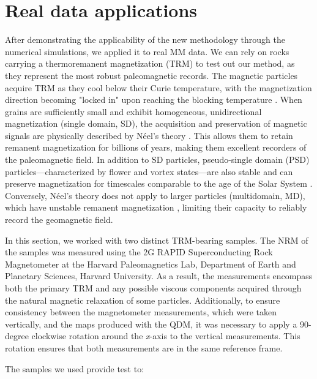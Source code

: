 \section{Real data applications}

After demonstrating the applicability of the new methodology through the numerical simulations, we applied it to real MM data. We can rely on rocks carrying a thermoremanent magnetization (TRM) to test out our method, as they represent the most robust paleomagnetic records. The magnetic particles \citep[most commonly magnetite,][]{OReilly1984} acquire TRM as they cool below their Curie temperature, with the magnetization direction becoming "locked in" upon reaching the blocking temperature \citep{Dunlop1997}. When grains are sufficiently small and exhibit homogeneous, unidirectional magnetization (single domain, SD), the acquisition and preservation of magnetic signals are physically described by Néel’s theory \citep{Neel1949, Neel1955}. This allows them to retain remanent magnetization for billions of years, making them excellent recorders of the paleomagnetic field. In addition to SD particles, pseudo-single domain (PSD) particles—characterized by flower and vortex states—are also stable and can preserve magnetization for timescales comparable to the age of the Solar System \citep{Nagy2017, Lascu2018,Bellon-2024a}. Conversely, Néel’s theory does not apply to larger particles (multidomain, MD), which have unstable remanent magnetization \citep[e.g., due to viscous domain reorganization,][]{DeGroot2014}, limiting their capacity to reliably record the geomagnetic field. 

In this section, we worked with two distinct TRM-bearing samples. The NRM of the samples was measured using the 2G RAPID Superconducting Rock Magnetometer at the Harvard Paleomagnetics Lab, Department of Earth and Planetary Sciences, Harvard University. As a result, the measurements encompass both the primary TRM and any possible viscous components acquired through the natural magnetic relaxation of some particles. Additionally, to ensure consistency between the magnetometer measurements, which were taken vertically, and the maps produced with the QDM, it was necessary to apply a 90-degree clockwise rotation around the \textit{x}-axis to the vertical measurements. This rotation ensures that both measurements are in the same reference frame.

The samples we used provide test to:

